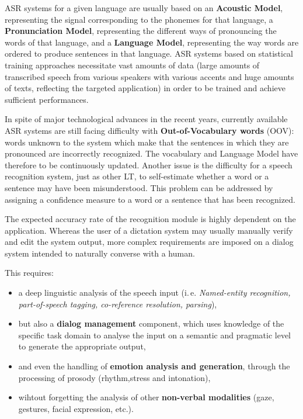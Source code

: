 \begin{multicols}{2}
ASR systems for a given language are usually based on an {\bf Acoustic
Model}, representing the signal corresponding to the phonemes for that
language, a {\bf Pronunciation Model}, representing the different ways of
pronouncing the words of that language, and a {\bf Language Model},
representing the way words are ordered to produce sentences in that
language. ASR systems based on statistical training approaches
necessitate vast amounts of data (large amounts of transcribed speech
from various speakers with various accents and huge amounts of texts,
reflecting the targeted application) in order to be trained and
achieve sufficient performances.

In spite of major technological advances in the recent years,
currently available ASR systems are still facing difficulty with
{\bf Out-of-Vocabulary words} (OOV): words unknown to the system which make
that the sentences in which they are pronounced are incorrectly
recognized. The vocabulary and Language Model have therefore to be
continuously updated. Another issue is the difficulty for a speech
recognition system, just as other LT, to self-estimate whether a word
or a sentence may have been misunderstood. This problem can be
addressed by assigning a confidence measure to a word or a sentence
that has been recognized.

The expected accuracy rate of the recognition module is highly
dependent on the application. Whereas the user of a dictation system
may usually manually verify and edit the system output, more complex
requirements are imposed on a dialog system intended to naturally
converse with a human. 

This requires:
\begin{itemize} 
\item a deep linguistic analysis of the speech input (i.\,e. {\em
  Named-entity recognition, part-of-speech tagging, co-reference
  resolution, parsing}),
\item but also a {\bf dialog management} component, which uses
  knowledge of the specific task domain to analyse the input on a
  semantic and pragmatic level to generate the appropriate output,
\item and even the handling of {\bf emotion analysis and generation},
  through the processing of prosody (rhythm,stress and intonation),
\item wihtout forgetting the analysis of other {\bf non-verbal
  modalities} (gaze, gestures, facial expression, etc.).
\end{itemize}


\end{multicols}
